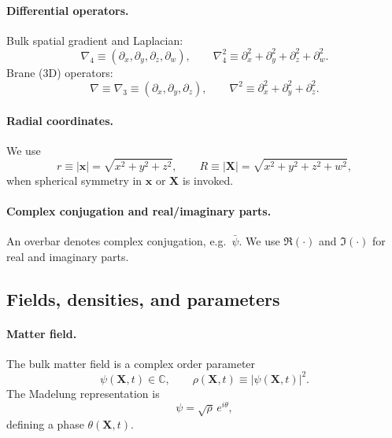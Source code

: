 \documentclass[11pt]{article}
\begin{document}
\paragraph{Differential operators.}
Bulk spatial gradient and Laplacian:
\begin{equation}
  \nabla_4 \equiv (\partial_x,\partial_y,\partial_z,\partial_w),
  \qquad
  \nabla_4^2 \equiv \partial_x^2+\partial_y^2+\partial_z^2+\partial_w^2.
\end{equation}
Brane (3D) operators:
\begin{equation}
  \nabla \equiv \nabla_3 \equiv (\partial_x,\partial_y,\partial_z),
  \qquad
  \nabla^2 \equiv \partial_x^2+\partial_y^2+\partial_z^2.
\end{equation}

\paragraph{Radial coordinates.}
We use
\begin{equation}
  r \equiv |\mathbf x| = \sqrt{x^2+y^2+z^2},
  \qquad
  R \equiv |\mathbf X| = \sqrt{x^2+y^2+z^2+w^2},
\end{equation}
when spherical symmetry in $\mathbf x$ or $\mathbf X$ is invoked.

\paragraph{Complex conjugation and real/imaginary parts.}
An overbar denotes complex conjugation, e.g.\ $\bar\psi$.
We use $\Re(\cdot)$ and $\Im(\cdot)$ for real and imaginary parts.

\subsection{Fields, densities, and parameters}

\paragraph{Matter field.}
The bulk matter field is a complex order parameter
\begin{equation}
  \psi(\mathbf X,t)\in\mathbb C,
  \qquad
  \rho(\mathbf X,t)\equiv |\psi(\mathbf X,t)|^2.
\end{equation}
The Madelung representation is
\begin{equation}
  \psi = \sqrt{\rho}\,e^{i\theta},
\end{equation}
defining a phase $\theta(\mathbf X,t)$.
\end{document}
